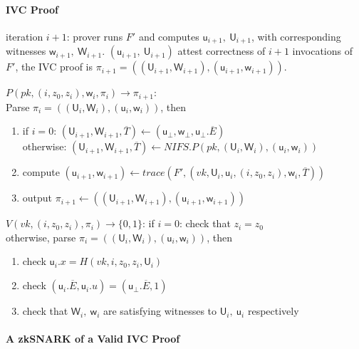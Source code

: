 \documentclass{article}
\theoremstyle{definition}
\begin{document}

\paragraph{IVC Proof}
iteration $i+1$: prover runs $F'$ and computes $\mathsf{u}_{i+1},~ \mathsf{U}_{i+1}$, with corresponding witnesses $\mathsf{w}_{i+1},~ \mathsf{W}_{i+1}$.
$(\mathsf{u}_{i+1},~ \mathsf{U}_{i+1})$ attest correctness of $i+1$ invocations of $F'$, the IVC proof is $\pi_{i+1} = ( (\mathsf{U}_{i+1}, \mathsf{W}_{i+1}), (\mathsf{u}_{i+1}, \mathsf{w}_{i+1}))$.


\vspace{0.5cm}

\underline{$P(pk, (i, z_0, z_i), \mathsf{w}_i, \pi_i) \rightarrow \pi_{i+1}$}:\\
Parse $\pi_i = ( (\mathsf{U}_i, \mathsf{W}_i), (\mathsf{u}_i, \mathsf{w}_i))$, then
\begin{enumerate}
	\item if $i=0$: $(\mathsf{U}_{i+1}, \mathsf{W}_{i+1}, \overline{T}) \leftarrow (\mathsf{u}_{\perp}, \mathsf{w}_{\perp}, \mathsf{u}_{\perp}.{\overline{E}})$\\
		otherwise: $(\mathsf{U}_{i+1}, \mathsf{W}_{i+1}, \overline{T}) \leftarrow NIFS.P(pk, (\mathsf{U}_i, \mathsf{W}_i), (\mathsf{u}_i, \mathsf{w}_i))$
	\item compute $(\mathsf{u}_{i+1}, \mathsf{w}_{i+1}) \leftarrow trace(F', (vk, \mathsf{U}_i, \mathsf{u}_i, (i, z_0, z_i), \mathsf{w}_i, \overline{T}))$
	\item output $\pi_{i+1} \leftarrow ((\mathsf{U}_{i+1}, \mathsf{W}_{i+1}), (\mathsf{u}_{i+1}, \mathsf{w}_{i+1}))$
\end{enumerate}

\underline{$V(vk, (i, z_0, z_i), \pi_i) \rightarrow \{0,1\}$}:
if $i=0$: check that $z_i=z_0$\\
otherwise, parse $\pi_i = ( (\mathsf{U}_i, \mathsf{W}_i), (\mathsf{u}_i, \mathsf{w}_i))$, then
\begin{enumerate}
	\item check $\mathsf{u}_i.x = H(vk, i, z_0, z_i, \mathsf{U}_i)$
	\item check $(\mathsf{u}_i.{\overline{E}}, \mathsf{u}_i.u) = (\mathsf{u}_{\perp}.{\overline{E}}, 1)$
	\item check that $\mathsf{W}_i,~ \mathsf{w}_i$ are satisfying witnesses to $\mathsf{U}_i,~ \mathsf{u}_i$ respectively
\end{enumerate}

\paragraph{A zkSNARK of a Valid IVC Proof}




\end{document}
